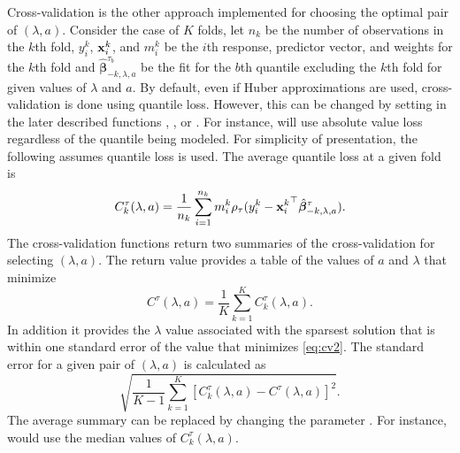 Cross-validation is the other approach implemented for choosing the optimal pair of \((\lambda,a)\). Consider the case of \(K\) folds, let \(n_k\) be the number of observations in the \(k\)th fold, \(y_i^k\), \({\bf x}_i^k\), and \(m_i^k\) be the \(i\)th response, predictor vector, and weights for the \(k\)th fold and \(\hat{\bm \beta}^{\tau_b}_{-k,\lambda,a}\) be the fit for the \(b\)th quantile excluding the \(k\)th fold for given values of \(\lambda\) and \(a\). By default, even if Huber approximations are used, cross-validation is done using quantile loss. However, this can be changed by setting  in the later described functions , , or . For instance,  will use absolute value loss regardless of the quantile being modeled. For simplicity of presentation, the following assumes quantile loss is used. The average quantile loss at a given fold is
\begin{equation}
C_k^\tau(\lambda,a) = \frac{1}{n_k} \sum_{i=1}^{n_k} m_i^k \rho_\tau(y_i^k-{{\bf x}_i^k}^\top\hat{\bm \beta}^{\tau}_{-k,\lambda,a}).
\label{eq:cv1}
\end{equation}
The cross-validation functions return two summaries of the cross-validation for selecting \((\lambda,a)\). The return value  provides a table of the values of \(a\) and \(\lambda\) that minimize
\begin{equation}
C^\tau(\lambda,a) = \frac{1}{K} \sum_{k=1}^K C_k^\tau(\lambda,a).
\label{eq:cv2}
\end{equation}
In addition it provides the \(\lambda\) value associated with the sparsest solution that is within one standard error of the value that minimizes \eqref{eq:cv2}. The standard error for a given pair of \((\lambda,a)\) is calculated as
\begin{equation}
\sqrt{\frac{1}{K-1} \sum_{k=1}^K \left[C_k^\tau(\lambda,a)-C^\tau(\lambda,a) \right]^2}.
\end{equation}
The average summary can be replaced by changing the parameter . For instance,  would use the median values of \(C_k^\tau(\lambda,a)\).

